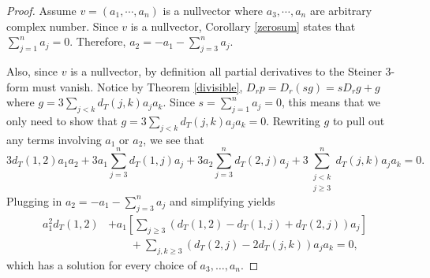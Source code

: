 \documentclass{article}
\begin{document}
\begin{proof}
    Assume $v = (a_1, \cdots, a_n)$ is a nullvector where $a_3, \cdots, a_n$ are arbitrary complex number. Since $v$ is a nullvector, Corollary \ref{zerosum} states that $\sum_{j=1}^n a_j = 0$. Therefore, $a_2 = -a_1 - \sum_{j=3}^na_j$. 
    
    Also, since $v$ is a nullvector, by definition all partial derivatives to the Steiner 3-form must vanish. Notice by Theorem \ref{divisible}, $D_rp = D_r(sg) = sD_rg + g$ where $g = 3\sum_{j<k}d_T(j,k)a_ja_k$. Since $s = \sum_{j=1}^na_j = 0$, this means that we only need to show that $g = 3\sum_{j<k}d_T(j,k)a_ja_k = 0$. Rewriting $g$ to pull out any terms involving $a_1$ or $a_2$, we see that 
    $$
    3d_T(1,2)a_1a_2+3a_1\sum_{j=3}^nd_T(1,j)a_j + 3a_2\sum_{j=3}^nd_T(2,j)a_j + 3\sum_{\substack{j<k\\j \geq 3}}^nd_T(j,k)a_ja_k = 0.
    $$ 
    Plugging in $a_2 = -a_1 - \sum_{j=3}^na_j$ and simplifying yields
    \begin{align*}
    a_1^2 d_T(1,2) & + a_1 \left [ \sum_{j \geq 3} (d_T(1,2)-d_T(1,j)+d_T(2,j))a_j \right ] \\
    & \qquad + \sum_{j,k \geq 3} (d_T(2,j)-2 d_T(j,k)) a_j a_k = 0,        
    \end{align*}
    which has a solution for every choice of $a_3,\ldots,a_n$.
\end{proof}



\end{document}
